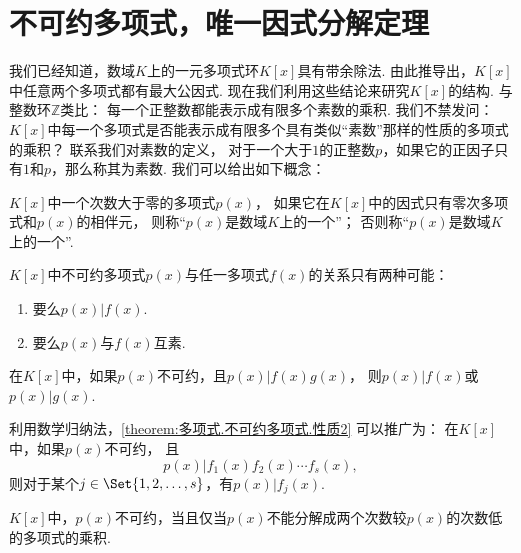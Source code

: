 \section{不可约多项式，唯一因式分解定理}
我们已经知道，数域\(K\)上的一元多项式环\(K[x]\)具有带余除法.
由此推导出，\(K[x]\)中任意两个多项式都有最大公因式.
现在我们利用这些结论来研究\(K[x]\)的结构.
与整数环\(\mathbb{Z}\)类比：
每一个正整数都能表示成有限多个素数的乘积.
我们不禁发问：\(K[x]\)中每一个多项式是否能表示成有限多个具有类似“素数”那样的性质的多项式的乘积？
联系我们对素数的定义，
对于一个大于\(1\)的正整数\(p\)，如果它的正因子只有\(1\)和\(p\)，那么称其为素数.
我们可以给出如下概念：
\begin{definition}
\(K[x]\)中一个次数大于零的多项式\(p(x)\)，
如果它在\(K[x]\)中的因式只有零次多项式和\(p(x)\)的相伴元，
则称“\(p(x)\)是数域\(K\)上的一个”；
否则称“\(p(x)\)是数域\(K\)上的一个”.
\end{definition}

\begin{property}%
\(K[x]\)中不可约多项式\(p(x)\)与任一多项式\(f(x)\)的关系只有两种可能：
\begin{enumerate}
	\item 要么\(p(x) \vert f(x)\).
	\item 要么\(p(x)\)与\(f(x)\)互素.
\end{enumerate}
\end{property}

\begin{property}\label{theorem:多项式.不可约多项式.性质2}
在\(K[x]\)中，如果\(p(x)\)不可约，且\(p(x) \vert f(x) g(x)\)，
则\(p(x) \vert f(x)\)或\(p(x) \vert g(x)\).
\end{property}

利用数学归纳法，\cref{theorem:多项式.不可约多项式.性质2} 可以推广为：
在\(K[x]\)中，如果\(p(x)\)不可约，
且\[
	p(x) \vert f_1(x) f_2(x) \dotsm f_s(x),
\]
则对于某个\(j \in \Set{1,2,\dotsc,s}\)，有\(p(x) \vert f_j(x)\).

\begin{property}\label{theorem:多项式.不可约多项式.性质3}
\(K[x]\)中，\(p(x)\)不可约，当且仅当\(p(x)\)不能分解成两个次数较\(p(x)\)的次数低的多项式的乘积.
\end{property}

